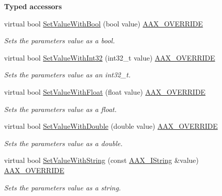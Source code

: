 \begin{Indent}{\bf Typed accessors}
\begin{DoxyCompactItemize}
virtual bool \hyperlink{a00033_a2089ea0d243087c562ce8b1bd89a495a}{Set\+Value\+With\+Bool} (bool value) \hyperlink{a00149_ac2f24a5172689ae684344abdcce55463}{A\+A\+X\+\_\+\+O\+V\+E\+R\+R\+I\+D\+E}
\begin{DoxyCompactList}\small\item\em Sets the parameter\textquotesingle{}s value as a bool. \end{DoxyCompactList}\item 
virtual bool \hyperlink{a00033_aaf45f020a267f894429b4a75ddbe9c6c}{Set\+Value\+With\+Int32} (int32\+\_\+t value) \hyperlink{a00149_ac2f24a5172689ae684344abdcce55463}{A\+A\+X\+\_\+\+O\+V\+E\+R\+R\+I\+D\+E}
\begin{DoxyCompactList}\small\item\em Sets the parameter\textquotesingle{}s value as an int32\+\_\+t. \end{DoxyCompactList}\item 
virtual bool \hyperlink{a00033_ab3f589671d20c826859b4398e96ee9bb}{Set\+Value\+With\+Float} (float value) \hyperlink{a00149_ac2f24a5172689ae684344abdcce55463}{A\+A\+X\+\_\+\+O\+V\+E\+R\+R\+I\+D\+E}
\begin{DoxyCompactList}\small\item\em Sets the parameter\textquotesingle{}s value as a float. \end{DoxyCompactList}\item 
virtual bool \hyperlink{a00033_a7551c4071f91cb48103b5a8dda8f73eb}{Set\+Value\+With\+Double} (double value) \hyperlink{a00149_ac2f24a5172689ae684344abdcce55463}{A\+A\+X\+\_\+\+O\+V\+E\+R\+R\+I\+D\+E}
\begin{DoxyCompactList}\small\item\em Sets the parameter\textquotesingle{}s value as a double. \end{DoxyCompactList}\item 
virtual bool \hyperlink{a00033_a0304e07f471e1a9dd804bbba7940281e}{Set\+Value\+With\+String} (const \hyperlink{a00113}{A\+A\+X\+\_\+\+I\+String} \&value) \hyperlink{a00149_ac2f24a5172689ae684344abdcce55463}{A\+A\+X\+\_\+\+O\+V\+E\+R\+R\+I\+D\+E}
\begin{DoxyCompactList}\small\item\em Sets the parameter\textquotesingle{}s value as a string. \end{DoxyCompactList}\end{DoxyCompactItemize}
\end{Indent}

